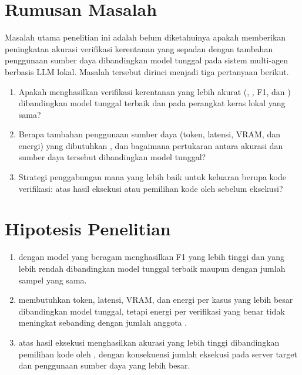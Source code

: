 \section{Rumusan Masalah}
\label{sec:rumusan-masalah}
Masalah utama penelitian ini adalah belum diketahuinya apakah 
memberikan peningkatan akurasi verifikasi kerentanan yang sepadan dengan tambahan
penggunaan sumber daya dibandingkan model tunggal pada sistem multi-agen berbasis
LLM lokal. Masalah tersebut dirinci menjadi tiga pertanyaan berikut.
\begin{enumerate}
  \item Apakah  menghasilkan verifikasi kerentanan yang lebih
        akurat (, , F1, dan ) dibandingkan model tunggal terbaik dan 
        pada perangkat keras lokal yang sama?
  \item Berapa tambahan penggunaan sumber daya (token, latensi, VRAM, dan energi)
        yang dibutuhkan , dan bagaimana pertukaran antara
        akurasi dan sumber daya tersebut dibandingkan model tunggal?
  \item Strategi penggabungan mana yang lebih baik untuk keluaran berupa kode
        verifikasi:  atas hasil eksekusi atau pemilihan kode oleh
         sebelum eksekusi?
\end{enumerate}

\section{Hipotesis Penelitian}
\label{sec:hipotesis}
\begin{enumerate}
  \item {} dengan model yang beragam menghasilkan F1 yang lebih
        tinggi dan  yang lebih rendah dibandingkan
        model tunggal terbaik maupun  dengan jumlah
        sampel yang sama.
  \item {} membutuhkan token, latensi, VRAM, dan energi per kasus
        yang lebih besar dibandingkan model tunggal, tetapi energi per verifikasi
        yang benar tidak meningkat sebanding dengan jumlah anggota
        .
  \item {} atas hasil eksekusi menghasilkan akurasi yang lebih tinggi
        dibandingkan pemilihan kode oleh , dengan konsekuensi
        jumlah eksekusi pada server target dan penggunaan sumber daya yang lebih
        besar.
\end{enumerate}

